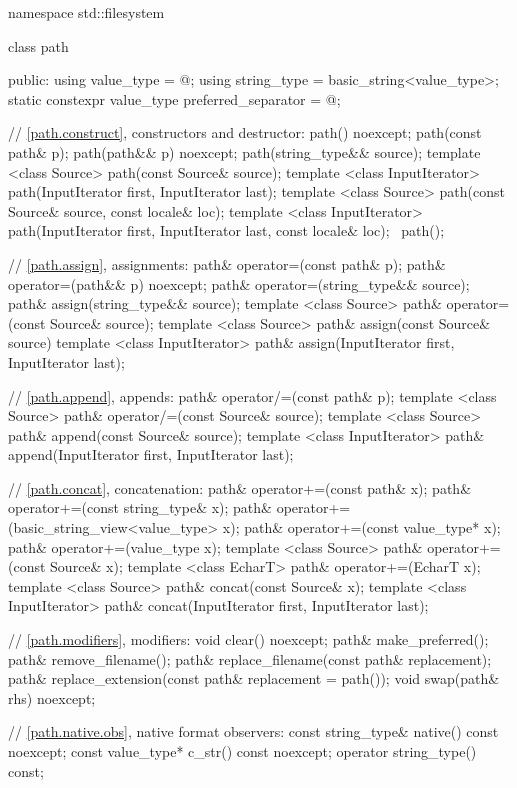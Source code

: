 \begin{codeblock}
namespace std::filesystem {
  class path {
  public:
    using value_type  = @\seebelow@;
    using string_type = basic_string<value_type>;
    static constexpr value_type preferred_separator = @\seebelow@;

    // \ref{path.construct}, constructors and destructor:
    path() noexcept;
    path(const path& p);
    path(path&& p) noexcept;
    path(string_type&& source);
    template <class Source>
      path(const Source& source);
    template <class InputIterator>
      path(InputIterator first, InputIterator last);
    template <class Source>
      path(const Source& source, const locale& loc);
    template <class InputIterator>
      path(InputIterator first, InputIterator last, const locale& loc);
   ~path();

    // \ref{path.assign}, assignments:
    path& operator=(const path& p);
    path& operator=(path&& p) noexcept;
    path& operator=(string_type&& source);
    path& assign(string_type&& source);
    template <class Source>
      path& operator=(const Source& source);
    template <class Source>
      path& assign(const Source& source)
    template <class InputIterator>
      path& assign(InputIterator first, InputIterator last);

    // \ref{path.append}, appends:
    path& operator/=(const path& p);
    template <class Source>
      path& operator/=(const Source& source);
    template <class Source>
      path& append(const Source& source);
    template <class InputIterator>
      path& append(InputIterator first, InputIterator last);

    // \ref{path.concat}, concatenation:
    path& operator+=(const path& x);
    path& operator+=(const string_type& x);
    path& operator+=(basic_string_view<value_type> x);
    path& operator+=(const value_type* x);
    path& operator+=(value_type x);
    template <class Source>
      path& operator+=(const Source& x);
    template <class EcharT>
      path& operator+=(EcharT x);
    template <class Source>
      path& concat(const Source& x);
    template <class InputIterator>
      path& concat(InputIterator first, InputIterator last);

    // \ref{path.modifiers}, modifiers:
    void  clear() noexcept;
    path& make_preferred();
    path& remove_filename();
    path& replace_filename(const path& replacement);
    path& replace_extension(const path& replacement = path());
    void  swap(path& rhs) noexcept;

    // \ref{path.native.obs}, native format observers:
    const string_type& native() const noexcept;
    const value_type*  c_str() const noexcept;
    operator string_type() const;

}}
\end{codeblock}
